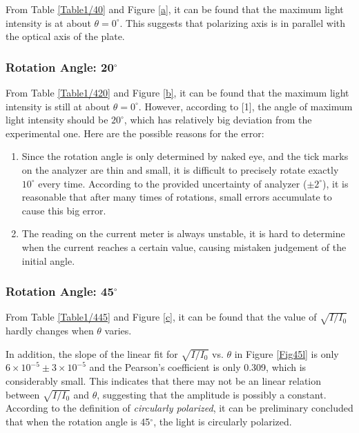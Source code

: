 \documentclass{article}
\begin{document}
From Table \ref{Table1/40} and Figure \ref{a}, it can be found that the maximum light intensity is at about $\theta = 0^\circ$. This suggests that polarizing axis is in parallel with the optical axis of the plate.

\subsubsection{Rotation Angle: 20$^\circ$}

From Table \ref{Table1/420} and Figure \ref{b}, it can be found that the 
maximum light intensity is still at about $\theta = 0^\circ$. However, according to [1], the angle of maximum light intensity should be $20^{\circ}$, which has relatively big deviation from the experimental one. 
Here are the possible reasons for the error:
\begin{enumerate}
\item Since the rotation angle is only determined by naked eye, and the tick marks on the analyzer are thin and small, it is difficult to precisely rotate exactly $10^{\circ}$ every time. According to the provided uncertainty of analyzer ($\pm2^{\circ}$), it is reasonable that after many times of rotations, small errors accumulate to cause this big error.
\item The reading on the  current meter is always unstable, it is hard to determine when the current reaches a certain value, causing mistaken judgement of the initial angle.
\end{enumerate}


\subsubsection{Rotation Angle: 45$^\circ$}

From Table \ref{Table1/445} and Figure \ref{c}, it can be found that the value of $\sqrt{I/I_0}$ hardly changes  when $\theta$ varies. 

In addition, the slope of the linear fit for $\sqrt{I/I_0}$ vs. $\theta$ in Figure \ref{Fig45l} is only $6 \times 10^{-5} \pm 3 \times 10^{-5}$ and the Pearson's coefficient is only 0.309, which is considerably small. This indicates that there may not be an linear relation between $\sqrt{I/I_0}$ and $\theta$, suggesting that the amplitude is possibly a constant. According to the definition of \textit{circularly polarized}, it can be preliminary concluded that when the rotation angle is 45$^\circ$, the light is circularly polarized. 
\end{document}
